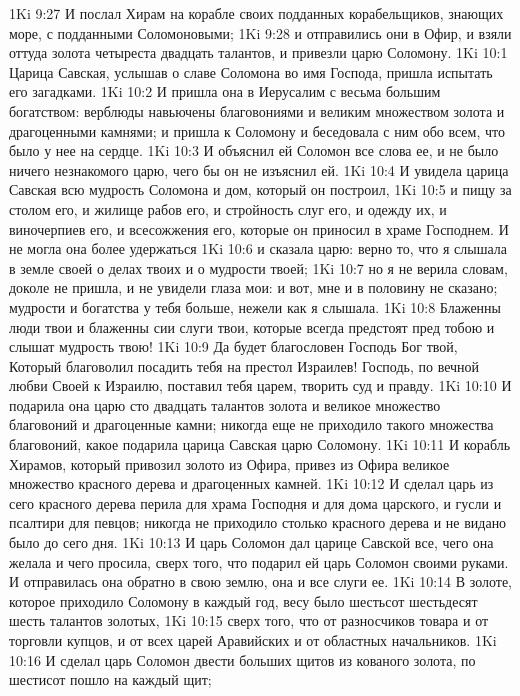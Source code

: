 \vs 1Ki 9:27 И послал Хирам на корабле своих подданных корабельщиков, знающих море, с подданными Соломоновыми;
\vs 1Ki 9:28 и отправились они в Офир, и взяли оттуда золота четыреста двадцать талантов, и привезли царю Соломону.
\vs 1Ki 10:1 Царица Савская, услышав о славе Соломона во имя Господа, пришла испытать его загадками.
\vs 1Ki 10:2 И пришла она в Иерусалим с весьма большим богатством: верблюды навьючены  благовониями и великим множеством золота и драгоценными камнями; и пришла к Соломону и беседовала с ним обо всем, что было у нее на сердце.
\vs 1Ki 10:3 И объяснил ей Соломон все слова ее, и не было ничего незнакомого царю, чего бы он не изъяснил ей.
\vs 1Ki 10:4 И увидела царица Савская всю мудрость Соломона и дом, который он построил,
\vs 1Ki 10:5 и пищу за столом его, и жилище рабов его, и стройность слуг его, и одежду их, и виночерпиев его, и всесожжения его, которые он приносил в храме Господнем. И не могла она более удержаться
\vs 1Ki 10:6 и сказала царю: верно то, что я слышала в земле своей о делах твоих и о мудрости твоей;
\vs 1Ki 10:7 но я не верила словам, доколе не пришла, и не увидели глаза мои: и вот, мне и в половину не сказано; мудрости и богатства у тебя больше, нежели как я слышала.
\vs 1Ki 10:8 Блаженны люди твои и блаженны сии слуги твои, которые всегда предстоят пред тобою и слышат мудрость твою!
\vs 1Ki 10:9 Да будет благословен Господь Бог твой, Который благоволил посадить тебя на престол Израилев! Господь, по вечной любви Своей к Израилю, поставил тебя царем, творить суд и правду.
\vs 1Ki 10:10 И подарила она царю сто двадцать талантов золота и великое множество благовоний и драгоценные камни; никогда еще не приходило такого множества благовоний, какое подарила царица Савская царю Соломону.
\vs 1Ki 10:11 И корабль Хирамов, который привозил золото из Офира, привез из Офира великое множество красного дерева и драгоценных камней.
\vs 1Ki 10:12 И сделал царь из сего красного дерева перила для храма Господня и для дома царского, и гусли и псалтири для певцов; никогда не приходило столько красного дерева и не видано было до сего дня.
\vs 1Ki 10:13 И царь Соломон дал царице Савской все, чего она желала и чего просила, сверх того, что подарил ей царь Соломон своими руками. И отправилась она обратно в свою землю, она и все слуги ее.
\rsbpar\vs 1Ki 10:14 В золоте, которое приходило Соломону в каждый год, весу было шестьсот шестьдесят шесть талантов золотых,
\vs 1Ki 10:15 сверх того, что  от разносчиков товара и от торговли купцов, и от всех царей Аравийских и от областных начальников.
\vs 1Ki 10:16 И сделал царь Соломон двести больших щитов из кованого золота, по шестисот  пошло на каждый щит;

